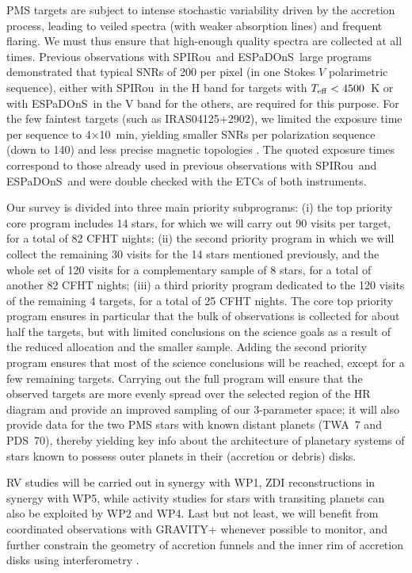 \documentclass[
    traditabstract,
    longauth,
    onecolumn,
]{aa}
\def \spi{SPIRou}
\def \esp{ESPaDOnS}
\begin{document}
 PMS targets are subject to intense stochastic variability driven by the accretion process, leading to veiled spectra (with weaker absorption lines) and frequent flaring.  We must thus ensure that high-enough quality spectra are collected at all times.  Previous observations with \spi\ and \esp\ large programs demonstrated that typical SNRs of 200 per pixel (in one Stokes $V$ polarimetric sequence), either with \spi\ in the H band for targets with $T_{\rm eff}<4500$~K or with \esp\ in the V band for the others, are required for this purpose.  For the few faintest targets (such as IRAS04125+2902), we limited the exposure time per sequence to 4$\times$10~min, yielding smaller SNRs per polarization sequence (down to 140) and less precise magnetic topologies \citep[though still detectable as demonstrated with previous observations, e.g.,][]{Donati2025}.  The quoted exposure times correspond to those already used in previous observations with \spi\ and \esp\ and were double checked with the ETCs of both instruments.  

Our survey is divided into three main priority subprograms: (i) the top priority core program includes 14 stars, for which we will carry out 90 visits per target, for a total of 82 CFHT nights; (ii) the second priority program in which we will collect the remaining 30 visits for the 14 stars mentioned previously, and the whole set of 120 visits for a complementary sample of 8 stars, for a total of another 82 CFHT nights; (iii) a third priority program dedicated to the 120 visits of the remaining 4 targets, for a total of 25 CFHT nights.  The core top priority program ensures in particular that the bulk of observations is collected for about half the targets, but with limited conclusions on the science goals as a result of the reduced allocation and the smaller sample.  Adding the second priority program ensures that most of the science conclusions will be reached, except for a few remaining targets.  Carrying out the full program will ensure that the observed targets are more evenly spread over the selected region of the HR diagram and provide an improved sampling of our 3-parameter space; it will also provide data for the two PMS stars with known distant planets (TWA~7 and PDS~70), thereby yielding key info about the architecture of planetary systems of stars known to possess outer planets in their (accretion or debris) disks.  

RV studies will be carried out in synergy with WP1, ZDI reconstructions in synergy with WP5, while activity studies for stars with transiting planets can also be exploited by WP2 and WP4.  Last but not least, we will benefit from coordinated observations with GRAVITY+ whenever possible to monitor, and further constrain the geometry of accretion funnels and the inner rim of accretion disks using interferometry \citep[e.g.,][]{Gravity2020,perraut2026}.
\end{document}
